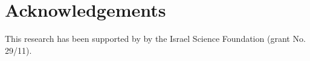 \documentclass[aps,pre,floats,floatfix,twocolumn]{revtex4}
\newcommand{\hidea}[1]{}    %
\begin{document}
{}
%



\section*{Acknowledgements}

This research has been supported by  by the Israel Science Foundation (grant No. 29/11).


\hidea{
\section*{Author contributions statement}

Both authors have contributed to this article. 

\section*{Additional information} 

The authors declare that they have no competing financial interests.
}
\end{document}
